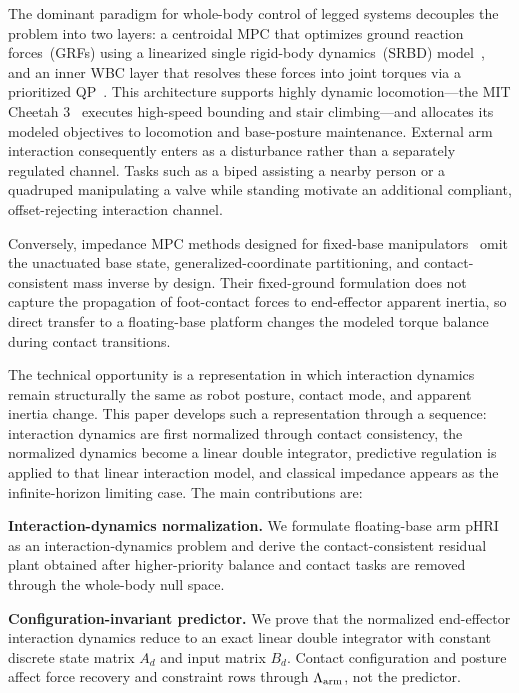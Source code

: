 The dominant paradigm for whole-body control of legged systems decouples
the problem into two layers: a centroidal MPC that optimizes ground
reaction forces~(GRFs) using a linearized single rigid-body dynamics~(SRBD)
model~\cite{dicarlo2018dynamic,kim2019highly}, and an inner WBC layer that
resolves these forces into joint torques via a prioritized
QP~\cite{bellicoso2016perception,koolen2016design}.
This architecture supports highly dynamic locomotion---the MIT Cheetah
3~\cite{dicarlo2018dynamic} executes high-speed bounding and stair
climbing---and allocates its modeled objectives to locomotion and base-posture
maintenance. External arm interaction consequently enters as a disturbance
rather than a separately regulated channel. Tasks such as a biped assisting a
nearby person or a quadruped manipulating a valve while standing motivate an
additional compliant, offset-rejecting interaction channel.

Conversely, impedance MPC methods designed for fixed-base
manipulators~\cite{cao2026impedance,cao2023passive,haninger2022model,roveda2020model}
omit the unactuated base state, generalized-coordinate partitioning, and
contact-consistent mass inverse by design. Their fixed-ground formulation does
not capture the propagation of foot-contact forces to end-effector apparent
inertia, so direct transfer to a floating-base platform changes the modeled
torque balance during contact transitions.

The technical opportunity is a representation in which interaction
dynamics remain structurally the same as robot posture, contact mode, and
apparent inertia change. This paper develops such a representation through a
sequence: interaction dynamics are first normalized through contact
consistency, the normalized dynamics become a linear double integrator,
predictive regulation is applied to that linear interaction model, and
classical impedance appears as the infinite-horizon limiting case.
The main contributions are:

\textbf{Interaction-dynamics normalization.}
We formulate floating-base arm pHRI as an interaction-dynamics problem and
derive the contact-consistent residual plant obtained after higher-priority
balance and contact tasks are removed through the whole-body null space.

\textbf{Configuration-invariant predictor.}
We prove that the normalized end-effector interaction dynamics reduce to an
exact linear double integrator with constant discrete state matrix $A_d$
and input matrix $B_d$. Contact configuration and posture affect force
recovery and constraint rows through $\Lambda_{\text{arm}}$, not the predictor.

